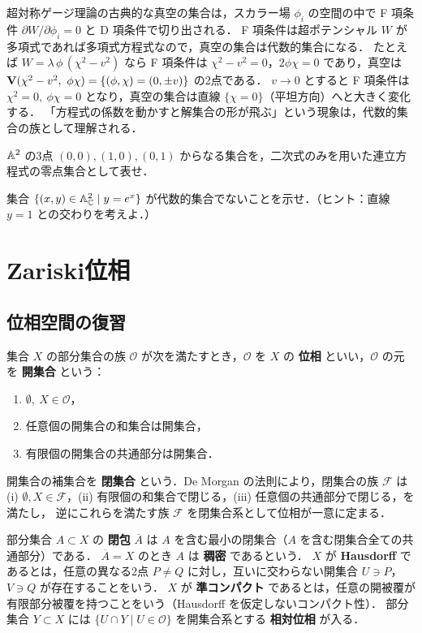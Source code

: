 \begin{physbox}[真空のモジュライ空間]
超対称ゲージ理論の古典的な真空の集合は，スカラー場 $\phi_i$ の空間の中で F 項条件 $\partial W/\partial\phi_i=0$ と D 項条件で切り出される．
F 項条件は超ポテンシャル $W$ が多項式であれば多項式方程式なので，真空の集合は代数的集合になる．
たとえば $W=\lambda\,\phi\,(\chi^2-v^2)$ なら F 項条件は $\chi^2-v^2=0$，$2\phi\chi=0$ であり，真空は $\Zero(\chi^2-v^2,\ \phi\chi)=\{(\phi,\chi)=(0,\pm v)\}$ の2点である．
$v\to0$ とすると F 項条件は $\chi^2=0,\ \phi\chi=0$ となり，真空の集合は直線 $\{\chi=0\}$（平坦方向）へと大きく変化する．
「方程式の係数を動かすと解集合の形が飛ぶ」という現象は，代数的集合の族として理解される．
\end{physbox}

 $\mathbb{A}^2$ の3点 $(0,0),(1,0),(0,1)$ からなる集合を，二次式のみを用いた連立方程式の零点集合として表せ．

 集合 $\{(x,y)\in\mathbb{A}^2_{\mathbb{C}}\mid y=e^x\}$ が代数的集合でないことを示せ．（ヒント：直線 $y=1$ との交わりを考えよ．）

\section{Zariski位相}
\label{sec:ch03-zariski}

\subsection{位相空間の復習}

集合 $X$ の部分集合の族 $\mathcal{O}$ が次を満たすとき，$\mathcal O$ を $X$ の \textbf{位相} といい，$\mathcal O$ の元を \textbf{開集合} という：
\begin{enumerate}
  \item $\emptyset,\ X\in\mathcal O$，
  \item 任意個の開集合の和集合は開集合，
  \item 有限個の開集合の共通部分は開集合．
\end{enumerate}
開集合の補集合を \textbf{閉集合} という．De Morgan の法則により，閉集合の族 $\mathcal F$ は
(i) $\emptyset,X\in\mathcal F$，(ii) 有限個の和集合で閉じる，(iii) 任意個の共通部分で閉じる，を満たし，
逆にこれらを満たす族 $\mathcal F$ を閉集合系として位相が一意に定まる．

部分集合 $A\subset X$ の \textbf{閉包} $\overline{A}$ は $A$ を含む最小の閉集合（$A$ を含む閉集合全ての共通部分）である．
$\overline A=X$ のとき $A$ は \textbf{稠密} であるという．
$X$ が \textbf{Hausdorff} であるとは，任意の異なる2点 $P\ne Q$ に対し，互いに交わらない開集合 $U\ni P$，$V\ni Q$ が存在することをいう．
$X$ が \textbf{準コンパクト} であるとは，任意の開被覆が有限部分被覆を持つことをいう（Hausdorff を仮定しないコンパクト性）．
部分集合 $Y\subset X$ には $\{U\cap Y\mid U\in\mathcal O\}$ を開集合系とする \textbf{相対位相} が入る．

